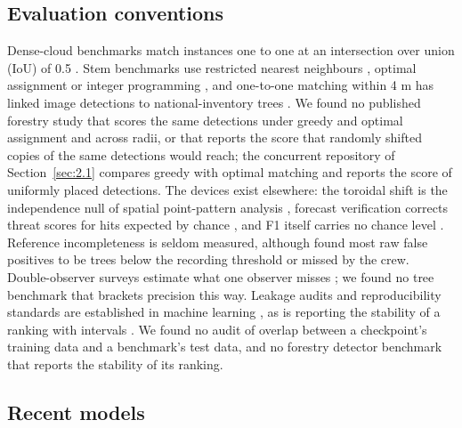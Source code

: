 \documentclass[preprint,12pt,authoryear,a4paper]{elsarticle}
\begin{document}
\subsection{Evaluation conventions}\label{sec:2.2}

Dense-cloud benchmarks match instances one to one at an intersection over union
(IoU) of 0.5 \citep{puliti2023forinstance,xiang2025forestformer3d,ruoppa2026benchmarking}. Stem benchmarks use restricted nearest neighbours
\citep{eysn2015benchmark}, optimal assignment \citep{hamraz2016robust,kuhn1955hungarian}
or integer programming \citep{hershey2022voxelbased}, and one-to-one matching within
4 m has linked image detections to national-inventory trees
\citep{gominski2025mining}. We found no published forestry study that scores the same
detections under greedy and optimal assignment and across radii, or that reports
the score that randomly shifted copies of the same detections would reach; the
concurrent repository of Section~\ref{sec:2.1} compares greedy with optimal matching and
reports the score of uniformly placed detections. The devices exist elsewhere:
the toroidal shift is the independence null of spatial point-pattern analysis
\citep{lotwick1982methods,wiegand2004rings}, forecast verification corrects threat
scores for hits expected by chance \citep{hogan2010equitability}, and F1 itself
carries no chance level \citep{powers2011evaluation}. Reference incompleteness is
seldom measured, although \citet{hershey2022voxelbased} found most raw false positives
to be trees below the recording threshold or missed by the crew. Double-observer
surveys estimate what one observer misses \citep{nichols2000doubleobserver}; we found
no tree benchmark that brackets precision this way. Leakage audits and
reproducibility standards are established in machine learning
\citep{kapoor2023leakage,heil2021reproducibility}, as is reporting the stability of
a ranking with intervals \citep{dehghani2021benchmark,agarwal2021deep}. We found no
audit of overlap between a checkpoint's training data and a benchmark's test
data, and no forestry detector benchmark that reports the stability of its
ranking.

\subsection{Recent models}\label{sec:2.3}
\end{document}
